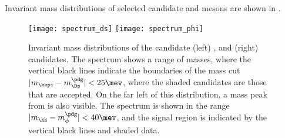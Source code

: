 Invariant mass distributions of
selected candidate \Ds and \phii mesons are shown in .

\begin{figure}
  \begin{center}
    \texttt{[image: spectrum\_ds]}
    \texttt{[image: spectrum\_phi]}
    \caption{\small
      Invariant mass distributions of the candidate
      (left) \decay{\Ds}{\kkpi}, and
      (right) \decay{\phii}{\kk} candidates.
      The \kkpi spectrum shows a range of masses, where the vertical black lines indicate the
      boundaries of the mass cut $|m_{\kkpi}-m_{\Ds}^\pdg|<25\mev$, where the shaded candidates are
      those that are accepted.
      On the far left of this distribution, a mass peak from \decay{\Dp}{\kkpi} is also visible.
      The \decay{\phi}{\kk} spectrum is shown in the range $|m_{\kk}-m_{\phi}^\pdg|<40\mev$,
      and the signal region is indicated by the vertical black lines and shaded data.
    }
    \label{fig:dsphi:mesons}
  \end{center}
\end{figure}










